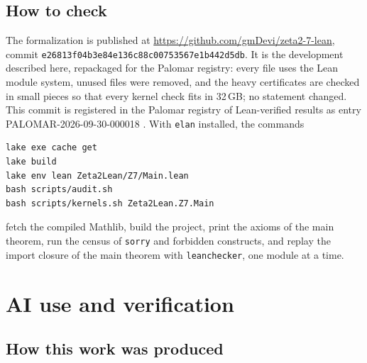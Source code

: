 \documentclass{amsart}
\theoremstyle{definition}
\theoremstyle{remark}
\numberwithin{equation}{section}
\begin{document}
\subsection{How to check}\label{ss:formal-howto}

The formalization is published at
\url{https://github.com/gmDevi/zeta2-7-lean}, commit
\texttt{e26813f04b3e84e136c88c00753567e1b442d5db}. It is the development
described here, repackaged for the Palomar registry: every file uses the Lean
module system, unused files were removed, and the heavy certificates are checked
in small pieces so that every kernel check fits in 32\,GB; no statement changed.
This commit is registered in the Palomar registry of Lean-verified results as
entry PALOMAR-2026-09-30-000018 \cite{PalZ726}.
With \texttt{elan}
installed, the commands
\begin{verbatim}
lake exe cache get
lake build
lake env lean Zeta2Lean/Z7/Main.lean
bash scripts/audit.sh
bash scripts/kernels.sh Zeta2Lean.Z7.Main
\end{verbatim}
fetch the compiled Mathlib, build the project, print the axioms of the main
theorem, run the census of \texttt{sorry} and forbidden constructs, and replay
the import closure of the main theorem with \texttt{leanchecker}, one module at
a time.

\section{AI use and verification}\label{sec:ai}

\subsection{How this work was produced}\label{ss:ai-how}
\end{document}
